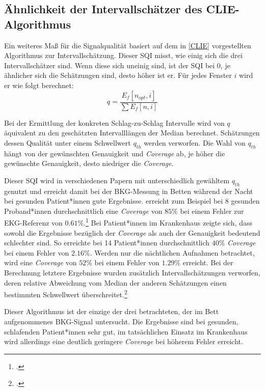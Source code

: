 	\subsection{Ähnlichkeit der Intervallschätzer des CLIE-Algorithmus}
	
	Ein weiteres Maß für die Signalqualität basiert auf dem in \ref{CLIE} vorgestellten Algorithmus zur Intervallschätzung. Dieser \acl{SQI} misst, wie einig sich die drei Intervallschätzer sind. Wenn diese sich uneinig sind, ist der \ac{SQI} bei 0, je ähnlicher sich die Schätzungen sind, desto höher ist er. Für jedes Fenster $i$ wird er wie folgt berechnet: \[ q = \frac{E_f[n_{opt}, i]}{\sum E_f[n, i]} \]
	
	Bei der Ermittlung der konkreten Schlag-zu-Schlag Intervalle wird von $q$ äquivalent zu den geschätzten Intervalllängen der Median berechnet. Schätzungen dessen Qualität unter einem Schwellwert $q_{th}$ werden verworfen. Die Wahl von $q_{th}$ hängt von der gewünschten Genauigkeit und \textit{Coverage} ab, je höher die gewünschte Genauigkeit, desto niedriger die \textit{Coverage}.
	
	Dieser \ac{SQI} wird in verschiedenen Papern mit unterschiedlich gewähltem $q_{th}$ genutzt und erreicht damit bei der \ac{BKG}-Messung in Betten während der Nacht bei gesunden Patient*innen gute Ergebnisse. \citeauthor{Bruser2013} erreicht zum Beispiel bei 8 gesunden Proband*innen durchschnittlich eine \textit{Coverage} von $85 \%$ bei einem Fehler zur \ac{EKG}-Referenz von $0.61 \%$.\footcite[Vgl.][]{Bruser2013} Bei Patient*innen im Krankenhaus zeigte sich, dass sowohl die Ergebnisse bezüglich der \textit{Coverage} als auch der Genauigkeit bedeutend schlechter sind. So erreichte \citeauthor{HoogAntink2020} bei 14 Patient*innen durchschnittlich $40 \%$ \textit{Coverage} bei einem Fehler von $2.16 \%$. Werden nur die nächtlichen Aufnahmen betrachtet, wird eine \textit{Coverage} von $52 \%$ bei einem Fehler von $1.29 \%$ erreicht. Bei der Berechnung letztere Ergebnisse wurden zusätzlich Intervallschätzungen verworfen, deren relative Abweichung vom Median der anderen Schätzungen einen bestimmten Schwellwert überschreitet.\footcite[Vgl.][]{HoogAntink2020}
	
	Dieser Algorithmus ist der einzige der drei betrachteten, der im Bett aufgenommenes \ac{BKG}-Signal untersucht. Die Ergebnisse sind bei gesunden, schlafenden Patient*innen sehr gut, im tatsächlichen Einsatz im Krankenhaus wird allerdings eine deutlich geringere \textit{Coverage} bei höherem Fehler erreicht.
	
